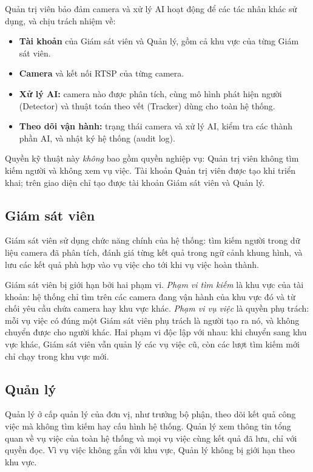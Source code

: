Quản trị viên bảo đảm camera và xử lý AI hoạt động để các tác nhân khác sử dụng, và chịu trách nhiệm về:
\begin{itemize}
    \item \textbf{Tài khoản} của Giám sát viên và Quản lý, gồm cả khu vực của từng Giám sát viên.
    \item \textbf{Camera} và kết nối RTSP của từng camera.
    \item \textbf{Xử lý AI:} camera nào được phân tích, cùng mô hình phát hiện người (Detector) và thuật toán theo vết (Tracker) dùng cho toàn hệ thống.
    \item \textbf{Theo dõi vận hành:} trạng thái camera và xử lý AI, kiểm tra các thành phần AI, và nhật ký hệ thống (audit log).
\end{itemize}
Quyền kỹ thuật này \emph{không} bao gồm quyền nghiệp vụ: Quản trị viên không tìm kiếm người và không xem vụ việc. Tài khoản Quản trị viên được tạo khi triển khai; trên giao diện chỉ tạo được tài khoản Giám sát viên và Quản lý.

\subsection{Giám sát viên}
\label{sec:4.1.2}

Giám sát viên sử dụng chức năng chính của hệ thống: tìm kiếm người trong dữ liệu camera đã phân tích, đánh giá từng kết quả trong ngữ cảnh khung hình, và lưu các kết quả phù hợp vào vụ việc cho tới khi vụ việc hoàn thành.

Giám sát viên bị giới hạn bởi hai phạm vi. \emph{Phạm vi tìm kiếm} là khu vực của tài khoản: hệ thống chỉ tìm trên các camera đang vận hành của khu vực đó và từ chối yêu cầu chứa camera hay khu vực khác. \emph{Phạm vi vụ việc} là quyền phụ trách: mỗi vụ việc có đúng một Giám sát viên phụ trách là người tạo ra nó, và không chuyển được cho người khác. Hai phạm vi độc lập với nhau: khi chuyển sang khu vực khác, Giám sát viên vẫn quản lý các vụ việc cũ, còn các lượt tìm kiếm mới chỉ chạy trong khu vực mới.

\subsection{Quản lý}
\label{sec:4.1.3}

Quản lý ở cấp quản lý của đơn vị, như trưởng bộ phận, theo dõi kết quả công việc mà không tìm kiếm hay cấu hình hệ thống. Quản lý xem thông tin tổng quan về vụ việc của toàn hệ thống và mọi vụ việc cùng kết quả đã lưu, chỉ với quyền đọc. Vì vụ việc không gắn với khu vực, Quản lý không bị giới hạn theo khu vực.

